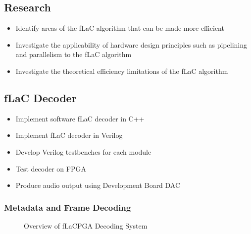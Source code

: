 \documentclass[12pt]{scrartcl}
\begin{document}
  \subsection{Research}
  \begin{itemize}
  \item Identify areas of the fLaC algorithm that can be made more efficient
  \item Investigate the applicability of hardware design principles such as pipelining and parallelism to the fLaC algorithm
  \item Investigate the theoretical efficiency limitations of the fLaC algorithm
  \end{itemize}
  
  
  \subsection{fLaC Decoder}
  \begin{itemize}
  \item Implement software fLaC decoder in C++
  \item Implement fLaC decoder in Verilog
  \item Develop Verilog testbenches for each module
  \item Test decoder on FPGA
  \item Produce audio output using Development Board DAC
  \end{itemize}
  
  \subsubsection{Metadata and Frame Decoding}
  \begin{figure}[H]
    \caption{Overview of fLaCPGA Decoding System}
    \label{fig:system_overview}
  \end{figure}
  
\end{document}

